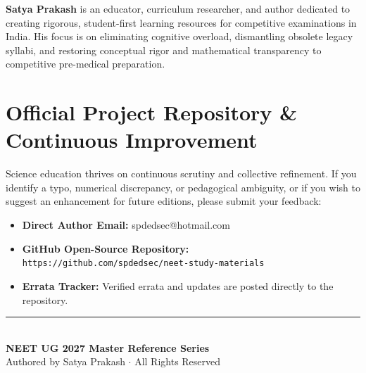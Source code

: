 \documentclass[10pt,twoside,openright]{book}
\begin{document}
\textbf{Satya Prakash} is an educator, curriculum researcher, and author dedicated to creating rigorous, student-first learning resources for competitive examinations in India. His focus is on eliminating cognitive overload, dismantling obsolete legacy syllabi, and restoring conceptual rigor and mathematical transparency to competitive pre-medical preparation.

\section*{Official Project Repository \& Continuous Improvement}

Science education thrives on continuous scrutiny and collective refinement. If you identify a typo, numerical discrepancy, or pedagogical ambiguity, or if you wish to suggest an enhancement for future editions, please submit your feedback:

\begin{itemize}
  \item \textbf{Direct Author Email:} spdedsec@hotmail.com
  \item \textbf{GitHub Open-Source Repository:}\\ \nolinkurl{https://github.com/spdedsec/neet-study-materials}
  \item \textbf{Errata Tracker:} Verified errata and updates are posted directly to the repository.
\end{itemize}

\vspace{1.5cm}
\begin{center}
  \rule{0.6\textwidth}{0.6pt}\\[6pt]
  {\small\textbf{\color{primarydark}NEET UG 2027 Master Reference Series}}\\[2pt]
  {\footnotesize\color{gray}Authored by Satya Prakash $\cdot$ All Rights Reserved}
\end{center}
\end{document}
